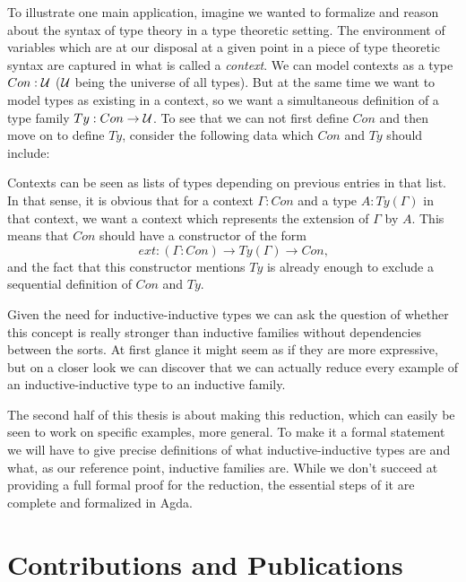 To illustrate one main application, imagine we wanted to formalize and reason
about the syntax of type theory in a type theoretic setting.
The environment of variables which are at our disposal at a given point in a piece
of type theoretic syntax are captured in what is called a \emph{context}.
We can model contexts as a type $Con : \mathcal{U}$ ($\mathcal{U}$ being the universe of all types).
But at the same time we want to model types as existing in a context, so we want
a simultaneous definition of a type family $Ty : Con \to \mathcal{U}$.
To see that we can not first define $Con$ and then move on to define $Ty$, consider
the following data which $Con$ and $Ty$ should include:

Contexts can be seen as lists of types depending on previous entries in that
list.
In that sense, it is obvious that for a context $\Gamma : Con$ and a type
$A : Ty(\Gamma)$ in that context, we want a context which represents the
extension of $\Gamma$ by $A$.
This means that $Con$ should have a constructor of the form
\begin{equation*}
ext: (\Gamma : Con) \to Ty(\Gamma) \to Con \text{,}
\end{equation*}
and the fact that this constructor mentions $Ty$ is already enough to exclude
a sequential definition of $Con$ and $Ty$.

Given the need for inductive-inductive types we can ask the question of whether
this concept is really stronger than inductive families without dependencies
between the sorts.
At first glance it might seem as if they are more expressive,
but on a closer look we can discover that we can actually reduce every
example of an inductive-inductive type to an inductive family.

The second half of this thesis is about making this reduction, which can easily
be seen to work on specific examples, more general.
To make it a formal statement we will have to give precise definitions of
what inductive-inductive types are and what, as our reference point,
inductive families are.
While we don't succeed at providing a full formal proof for the reduction,
the essential steps of it are complete and formalized in Agda. %

\section{Contributions and Publications}

